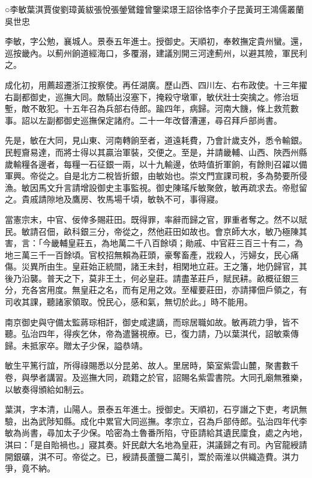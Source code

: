 
\begin{pinyinscope}
○李敏葉淇賈俊劉璋黃紱張悅張鎣鷿鐘曾鑒梁璟王詔徐恪李介子昆黃珂王鴻儒叢蘭吳世忠

李敏，字公勉，襄城人。景泰五年進士。授御史。天順初，奉敕撫定貴州蠻。還，巡按畿內。以薊州餉道經海口，多覆溺，建議別開三河達薊州，以避其險，軍民利之。

成化初，用薦超遷浙江按察使。再任湖廣。歷山西、四川左、右布政使。十三年擢右副都御史，巡撫大同。敵騎出沒塞下，掩殺守墩軍，敏伏壯士突擒之。修治垣塹，敵不敢犯。十五年召為兵部右侍郎。踰四年，病歸。河南大饑，條上救荒數事。詔以左副都御史巡撫保定諸府。二十一年改督漕運，尋召拜戶部尚書。

先是，敏在大同，見山東、河南轉餉至者，道遠耗費，乃會計歲支外，悉令輸銀。民輕齎易達，而將士得以其贏治軍裝，交便之。至是，并請畿輔、山西、陜西州縣歲輸糧各邊者，每糧一石征銀一兩，以十九輸邊，依時值折軍餉，有餘則召糴以備軍興。帝從之。自是北方二稅皆折銀，由敏始也。崇文門宣課司稅，多為勢要所侵漁。敏因馬文升言請增設御史主事監視。御史陳瑤斥敏聚斂，敏再疏求去。帝慰留之。貴戚請隙地及鷹房、牧馬場千頃，敏執不可，事得寢。

當憲宗末，中官、佞倖多賜莊田。既得罪，率辭而歸之官，罪重者奪之。然不以賦民。敏請召佃，畝科銀三分，帝從之，然他莊田如故也。會京師大水，敏乃極陳其害，言：「今畿輔皇莊五，為地萬二千八百餘頃；勛戚、中官莊三百三十有二，為地三萬三千一百餘頃。官校招無賴為莊頭，豪奪畜產，戕殺人，污婦女，民心痛傷。災異所由生。皇莊始正統間，諸王未封，相閑地立莊。王之籓，地仍歸官，其後乃沿襲。普天之下，莫非王土，何必皇莊。請盡革莊戶，賦民耕。畝概征銀三分，充各宮用度。無皇莊之名，而有足用之效。至權要莊田，亦請擇佃戶領之，有司收其課，聽諸家領取。悅民心，感和氣，無切於此。」時不能用。

南京御史與守備太監蔣琮相訐，御史咸逮謫，而琮居職如故。敏再疏力爭，皆不聽。弘治四年，得疾乞休，帝為遣醫視療。已，復力請，乃以葉淇代，詔敏乘傳歸。未抵家卒。贈太子少保，謚恭靖。

敏生平篤行誼，所得祿賜悉以分昆弟、故人。里居時，築室紫雲山麓，聚書數千卷，與學者講習。及巡撫大同，疏籍之於官，詔賜名紫雲書院。大同孔廟無雅樂，以敏奏得頒給如制云。

葉淇，字本清，山陽人。景泰五年進士。授御史。天順初，石亨譖之下吏，考訊無驗，出為武陟知縣。成化中累官大同巡撫。孝宗立，召為戶部侍郎。弘治四年代李敏為尚書，尋加太子少保。哈密為土魯番所陷，守臣請給其遺民廩食，處之內地，淇曰：「是自貽禍也。」寢其奏。奸民獻大名地為皇莊，淇議歸之有司。內官龍綬請開銀礦，淇不可。帝從之。已，綬請長蘆鹽二萬引，鬻於兩淮以供織造費。淇力爭，竟不納。


\end{pinyinscope}
